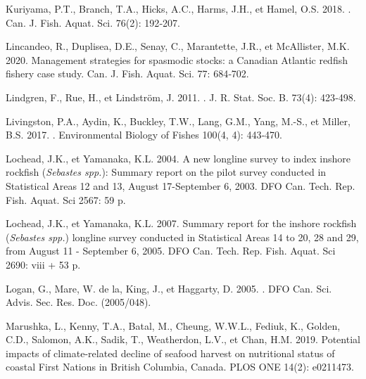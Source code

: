 \documentclass[french,11pt]{book}
\begin{document}
\begin{CSLReferences}{1}{0}
%
Kuriyama, P.T., Branch, T.A., Hicks, A.C., Harms, J.H., et Hamel, O.S. 2018. . Can. J. Fish. Aquat. Sci. 76(2): 192‑207.

%
Lincandeo, R., Duplisea, D.E., Senay, C., Marantette, J.R., et McAllister, M.K. 2020. Management strategies for spasmodic stocks: a {Canadian Atlantic} redfish fishery case study. Can. J. Fish. Aquat. Sci. 77: 684‑702.

%
Lindgren, F., Rue, H., et Lindström, J. 2011. . J. R. Stat. Soc. B. 73(4): 423‑498.

%
Livingston, P.A., Aydin, K., Buckley, T.W., Lang, G.M., Yang, M.-S., et Miller, B.S. 2017. . Environmental Biology of Fishes 100(4, 4): 443‑470.

%
Lochead, J.K., et Yamanaka, K.L. 2004. A new longline survey to index inshore rockfish ({\emph{Sebastes spp.}}): Summary report on the pilot survey conducted in Statistical Areas 12 and 13, {August} 17-{September} 6, 2003. DFO Can. Tech. Rep. Fish. Aquat. Sci 2567: 59 p.

%
Lochead, J.K., et Yamanaka, K.L. 2007. Summary report for the inshore rockfish ({\emph{Sebastes spp.}}) longline survey conducted in Statistical Areas 14 to 20, 28 and 29, from August 11 - September 6, 2005. DFO Can. Tech. Rep. Fish. Aquat. Sci 2690: viii + 53 p.

%
Logan, G., Mare, W. de la, King, J., et Haggarty, D. 2005. . DFO Can. Sci. Advis. Sec. Res. Doc. (2005/048).

%
Marushka, L., Kenny, T.A., Batal, M., Cheung, W.W.L., Fediuk, K., Golden, C.D., Salomon, A.K., Sadik, T., Weatherdon, L.V., et Chan, H.M. 2019. Potential impacts of climate-related decline of seafood harvest on nutritional status of coastal {First Nations} in {British Columbia, Canada}. PLOS ONE 14(2): e0211473.


\end{CSLReferences}
\end{document}
